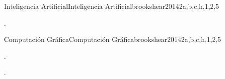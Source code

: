 \begin{syllabus}
\begin{unit}{Inteligencia Artificial}{Inteligencia Artificial}{brookshear2014}{2}{a,b,c,h,1,2,5}
   \begin{topics}
      \item \ISFundamentalIssuesTopicOverview
      \item \ISFundamentalIssuesTopicWhat
      \item \ISAdvancedMachineLearningTopicDefinition
      \item \ISAdvancedMachineLearningTopicSupervised
   \end{topics}
   \begin{learningoutcomes}
      \item \ISFundamentalIssuesLODeterming [\Familiarity].
   \end{learningoutcomes}
\end{unit}

\begin{unit}{Computación Gráfica}{Computación Gráfica}{brookshear2014}{2}{a,b,c,h,1,2,5}
   \begin{topics}
      \item \GVFundamentalConceptsTopicMedia
      \item \GVFundamentalConceptsTopicDigitization
      \item \CNInteractiveVisualizationTopicGraphing
      \item \CNInteractiveVisualizationTopicImage
   \end{topics}
   \begin{learningoutcomes}
      \item \GVFundamentalConceptsLOIdentifyCommon [\Familiarity].
      \item \GVFundamentalConceptsLOExplainIn [\Familiarity].
   \end{learningoutcomes}
\end{unit}


\begin{coursebibliography}
\end{coursebibliography}
\end{syllabus}
%
